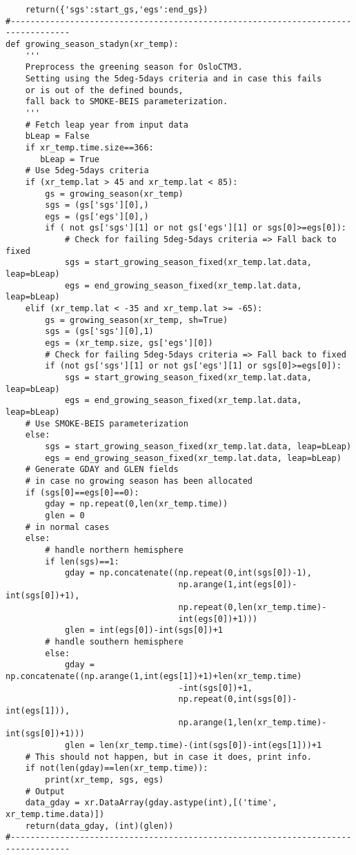 \documentclass[manuscript]{copernicus}
\begin{document}
{\begin{verbatim}
    return({'sgs':start_gs,'egs':end_gs})
#----------------------------------------------------------------------------------
def growing_season_stadyn(xr_temp):
    '''
    Preprocess the greening season for OsloCTM3.
    Setting using the 5deg-5days criteria and in case this fails
    or is out of the defined bounds,
    fall back to SMOKE-BEIS parameterization.
    '''
    # Fetch leap year from input data
    bLeap = False
    if xr_temp.time.size==366:
       bLeap = True
    # Use 5deg-5days criteria   
    if (xr_temp.lat > 45 and xr_temp.lat < 85):
        gs = growing_season(xr_temp)
        sgs = (gs['sgs'][0],)
        egs = (gs['egs'][0],)
        if ( not gs['sgs'][1] or not gs['egs'][1] or sgs[0]>=egs[0]):
            # Check for failing 5deg-5days criteria => Fall back to fixed
            sgs = start_growing_season_fixed(xr_temp.lat.data, leap=bLeap)
            egs = end_growing_season_fixed(xr_temp.lat.data, leap=bLeap)
    elif (xr_temp.lat < -35 and xr_temp.lat >= -65):
        gs = growing_season(xr_temp, sh=True)
        sgs = (gs['sgs'][0],1)
        egs = (xr_temp.size, gs['egs'][0])
        # Check for failing 5deg-5days criteria => Fall back to fixed
        if (not gs['sgs'][1] or not gs['egs'][1] or sgs[0]>=egs[0]):
            sgs = start_growing_season_fixed(xr_temp.lat.data, leap=bLeap)
            egs = end_growing_season_fixed(xr_temp.lat.data, leap=bLeap)
    # Use SMOKE-BEIS parameterization
    else:
        sgs = start_growing_season_fixed(xr_temp.lat.data, leap=bLeap)
        egs = end_growing_season_fixed(xr_temp.lat.data, leap=bLeap)
    # Generate GDAY and GLEN fields
    # in case no growing season has been allocated
    if (sgs[0]==egs[0]==0):
        gday = np.repeat(0,len(xr_temp.time))
        glen = 0
    # in normal cases
    else:
        # handle northern hemisphere
        if len(sgs)==1:
            gday = np.concatenate((np.repeat(0,int(sgs[0])-1),
                                   np.arange(1,int(egs[0])-int(sgs[0])+1),
                                   np.repeat(0,len(xr_temp.time)-
                                   int(egs[0])+1)))
            glen = int(egs[0])-int(sgs[0])+1
        # handle southern hemisphere
        else:
            gday = np.concatenate((np.arange(1,int(egs[1])+1)+len(xr_temp.time)
                                   -int(sgs[0])+1,
                                   np.repeat(0,int(sgs[0])-int(egs[1])),
                                   np.arange(1,len(xr_temp.time)-int(sgs[0])+1)))
            glen = len(xr_temp.time)-(int(sgs[0])-int(egs[1]))+1
    # This should not happen, but in case it does, print info.
    if not(len(gday)==len(xr_temp.time)):
        print(xr_temp, sgs, egs)
    # Output
    data_gday = xr.DataArray(gday.astype(int),[('time', xr_temp.time.data)])
    return(data_gday, (int)(glen))
#----------------------------------------------------------------------------------
\end{verbatim}
}
\clearpage
\end{document}
